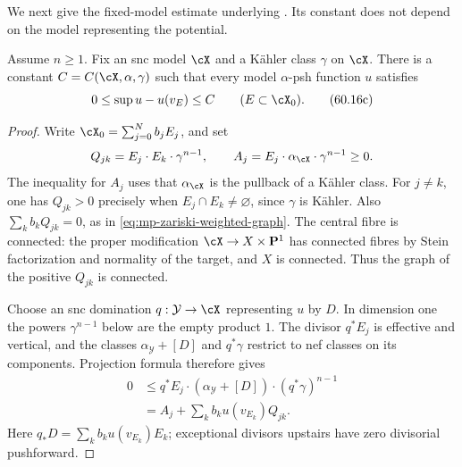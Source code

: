 We next give the fixed-model estimate underlying \cite[Theorem~4.3.3, p.~40]{MPTropicalV2}. Its constant does not depend on the model representing the potential.

\begin{proposition}\label{prop:mp-fixed-model-oscillation}
Assume $n\geq1$. Fix an snc model $\cX$ and a K\"ahler class $\gamma$ on $\cX$. There is a constant $C=C(\cX,\alpha,\gamma)$ such that every model $\alpha$-psh function $u$ satisfies
\[
       0\leq\sup u-u(v_E)\leq C
       \qquad (E\subset\cX_0).
\tag{60.16c}\label{eq:mp-fixed-model-oscillation}
\]
\end{proposition}

\begin{proof}
Write $\cX_0=\sum_{j=0}^N b_jE_j$, and set
\[
 Q_{jk}=E_j\cdot E_k\cdot\gamma^{n-1},\qquad
 A_j=E_j\cdot\alpha_{\cX}\cdot\gamma^{n-1}\geq0.
\]
The inequality for $A_j$ uses that $\alpha_{\cX}$ is the pullback of a K\"ahler class. For $j\ne k$, one has $Q_{jk}>0$ precisely when $E_j\cap E_k\ne\varnothing$, since $\gamma$ is K\"ahler. Also $\sum_kb_kQ_{jk}=0$, as in \eqref{eq:mp-zariski-weighted-graph}. The central fibre is connected: the proper modification $\cX\to X\times\mathbf P^1$ has connected fibres by Stein factorization and normality of the target, and $X$ is connected. Thus the graph of the positive $Q_{jk}$ is connected.

Choose an snc domination $q:\mathcal Y\to\cX$ representing $u$ by $D$. In dimension one the powers $\gamma^{n-1}$ below are the empty product $1$. The divisor $q^*E_j$ is effective and vertical, and the classes $\alpha_{\mathcal Y}+[D]$ and $q^*\gamma$ restrict to nef classes on its components. Projection formula therefore gives
\[
 \begin{aligned}
 0&\leq q^*E_j\cdot(\alpha_{\mathcal Y}+[D])\cdot(q^*\gamma)^{n-1}\\
  &=A_j+\sum_k b_k u(v_{E_k})Q_{jk}.
 \end{aligned}
\tag{60.16d}\label{eq:mp-vertex-intersection-bound}
\]
Here $q_*D=\sum_kb_k u(v_{E_k})E_k$; exceptional divisors upstairs have zero divisorial pushforward.


\end{proof}
